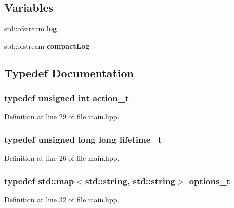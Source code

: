 \subsection*{Variables}
\begin{DoxyCompactItemize}
\item 
std\+::ofstream {\bf log}
\item 
std\+::ofstream {\bf compact\+Log}
\end{DoxyCompactItemize}


\subsection{Typedef Documentation}
\subsubsection[{action\+\_\+t}]{\setlength{\rightskip}{0pt plus 5cm}typedef unsigned int {\bf action\+\_\+t}}\label{main_8hpp_aa34a2cbe4c2a981beb51a5e6e625037a}


Definition at line 29 of file main.\+hpp.

\subsubsection[{lifetime\+\_\+t}]{\setlength{\rightskip}{0pt plus 5cm}typedef unsigned long long {\bf lifetime\+\_\+t}}\label{main_8hpp_a833e74b5bb1ab434077c5b068671e4b1}


Definition at line 26 of file main.\+hpp.

\subsubsection[{options\+\_\+t}]{\setlength{\rightskip}{0pt plus 5cm}typedef std\+::map$<$std\+::string, std\+::string$>$ {\bf options\+\_\+t}}\label{main_8hpp_a0ff5cac1a4007bb330b7d9939650c283}


Definition at line 32 of file main.\+hpp.

